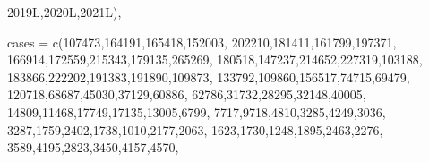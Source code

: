 \documentclass[
  letterpaper,
  DIV=11,
  numbers=noendperiod]{scrartcl}
\newenvironment{Shaded}{\begin{snugshade}}{\end{snugshade}}
\newcommand{\AttributeTok}[1]{\textcolor[rgb]{0.40,0.45,0.13}{#1}}
\newcommand{\DecValTok}[1]{\textcolor[rgb]{0.68,0.00,0.00}{#1}}
\newcommand{\FunctionTok}[1]{\textcolor[rgb]{0.28,0.35,0.67}{#1}}
\newcommand{\NormalTok}[1]{\textcolor[rgb]{0.00,0.23,0.31}{#1}}
\begin{document}
\begin{Shaded}
\begin{Highlighting}[]
\NormalTok{2019L,2020L,2021L),}

\AttributeTok{cases =} \FunctionTok{c}\NormalTok{(}\DecValTok{107473}\NormalTok{,}\DecValTok{164191}\NormalTok{,}\DecValTok{165418}\NormalTok{,}\DecValTok{152003}\NormalTok{,}
                                          \DecValTok{202210}\NormalTok{,}\DecValTok{181411}\NormalTok{,}\DecValTok{161799}\NormalTok{,}\DecValTok{197371}\NormalTok{,}
                                          \DecValTok{166914}\NormalTok{,}\DecValTok{172559}\NormalTok{,}\DecValTok{215343}\NormalTok{,}\DecValTok{179135}\NormalTok{,}\DecValTok{265269}\NormalTok{,}
                                          \DecValTok{180518}\NormalTok{,}\DecValTok{147237}\NormalTok{,}\DecValTok{214652}\NormalTok{,}\DecValTok{227319}\NormalTok{,}\DecValTok{103188}\NormalTok{,}
                                          \DecValTok{183866}\NormalTok{,}\DecValTok{222202}\NormalTok{,}\DecValTok{191383}\NormalTok{,}\DecValTok{191890}\NormalTok{,}\DecValTok{109873}\NormalTok{,}
                                          \DecValTok{133792}\NormalTok{,}\DecValTok{109860}\NormalTok{,}\DecValTok{156517}\NormalTok{,}\DecValTok{74715}\NormalTok{,}\DecValTok{69479}\NormalTok{,}
                                          \DecValTok{120718}\NormalTok{,}\DecValTok{68687}\NormalTok{,}\DecValTok{45030}\NormalTok{,}\DecValTok{37129}\NormalTok{,}\DecValTok{60886}\NormalTok{,}
                                          \DecValTok{62786}\NormalTok{,}\DecValTok{31732}\NormalTok{,}\DecValTok{28295}\NormalTok{,}\DecValTok{32148}\NormalTok{,}\DecValTok{40005}\NormalTok{,}
                                          \DecValTok{14809}\NormalTok{,}\DecValTok{11468}\NormalTok{,}\DecValTok{17749}\NormalTok{,}\DecValTok{17135}\NormalTok{,}\DecValTok{13005}\NormalTok{,}\DecValTok{6799}\NormalTok{,}
                                          \DecValTok{7717}\NormalTok{,}\DecValTok{9718}\NormalTok{,}\DecValTok{4810}\NormalTok{,}\DecValTok{3285}\NormalTok{,}\DecValTok{4249}\NormalTok{,}\DecValTok{3036}\NormalTok{,}
                                          \DecValTok{3287}\NormalTok{,}\DecValTok{1759}\NormalTok{,}\DecValTok{2402}\NormalTok{,}\DecValTok{1738}\NormalTok{,}\DecValTok{1010}\NormalTok{,}\DecValTok{2177}\NormalTok{,}\DecValTok{2063}\NormalTok{,}
                                          \DecValTok{1623}\NormalTok{,}\DecValTok{1730}\NormalTok{,}\DecValTok{1248}\NormalTok{,}\DecValTok{1895}\NormalTok{,}\DecValTok{2463}\NormalTok{,}\DecValTok{2276}\NormalTok{,}
                                          \DecValTok{3589}\NormalTok{,}\DecValTok{4195}\NormalTok{,}\DecValTok{2823}\NormalTok{,}\DecValTok{3450}\NormalTok{,}\DecValTok{4157}\NormalTok{,}\DecValTok{4570}\NormalTok{,}

\end{Highlighting}
\end{Shaded}
\end{document}
